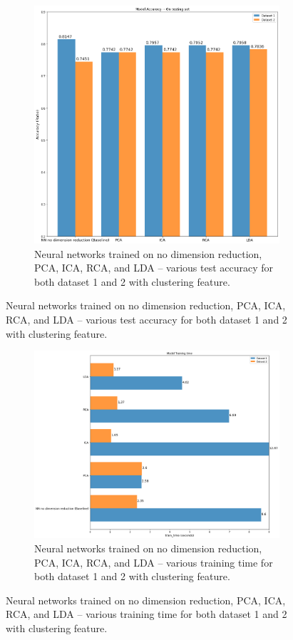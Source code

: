 \documentclass[
letterpaper, %
]{IEEEtran}
\begin{document}
	\begin{figure}[!b]
		\begin{subfigure}{1.0\linewidth}
			\centering
			\includegraphics[width=\linewidth]{./images/nn/testAccKmean.png}
			\caption{Neural networks trained on no dimension reduction, PCA, ICA, RCA, and LDA -- various test accuracy for both dataset 1 and 2 with clustering feature.}
			\label{fig:nnTestKmean}
		\end{subfigure}
	\end{figure}
	\begin{figure}[ht]\ContinuedFloat
		\begin{subfigure}{.5\textwidth}
			\centering
			\includegraphics[width=\linewidth]{./images/nn/trainTimeKmean.png}
			\caption{Neural networks trained on no dimension reduction, PCA, ICA, RCA, and LDA -- various training time for both dataset 1 and 2 with clustering feature.}
			\label{fig:nnTrainKmean}
		\end{subfigure}
	\end{figure}
\end{document}
